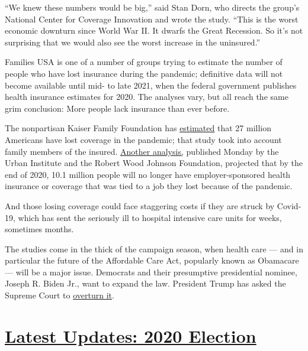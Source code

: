 ``We knew these numbers would be big,'' said Stan Dorn, who directs the
group's National Center for Coverage Innovation and wrote the study.
``This is the worst economic downturn since World War II. It dwarfs the
Great Recession. So it's not surprising that we would also see the worst
increase in the uninsured.''

Families USA is one of a number of groups trying to estimate the number
of people who have lost insurance during the pandemic; definitive data
will not become available until mid- to late 2021, when the federal
government publishes health insurance estimates for 2020. The analyses
vary, but all reach the same grim conclusion: More people lack insurance
than ever before.

The nonpartisan Kaiser Family Foundation has
\href{https://www.kff.org/coronavirus-covid-19/issue-brief/eligibility-for-aca-health-coverage-following-job-loss/}{estimated}
that 27 million Americans have lost coverage in the pandemic; that study
took into account family members of the insured.
\href{https://www.rwjf.org/en/library/research/2020/07/changes-in-health-insurance-coverage-due-to-the-covid-19-recession--preliminary-estimates-using-microsimulation.html?cid=xem_other_unpd_ini:quickstrike_dte:20200713_des:coverage\%20changes;\%20covid}{Another
analysis,} published Monday by the Urban Institute and the Robert Wood
Johnson Foundation, projected that by the end of 2020, 10.1 million
people will no longer have employer-sponsored health insurance or
coverage that was tied to a job they lost because of the pandemic.

And those losing coverage could face staggering costs if they are struck
by Covid-19, which has sent the seriously ill to hospital intensive care
units for weeks, sometimes months.

The studies come in the thick of the campaign season, when health care
--- and in particular the future of the Affordable Care Act, popularly
known as Obamacare --- will be a major issue. Democrats and their
presumptive presidential nominee, Joseph R. Biden Jr., want to expand
the law. President Trump has asked the Supreme Court to
\href{https://www.nytimes3xbfgragh.onion/2020/06/22/us/politics/republicans-health-care-coronavirus.html}{overturn
it}.

\hypertarget{latest-updates-2020-election}{%
\section{\texorpdfstring{\href{https://www.nytimes3xbfgragh.onion/2020/07/31/us/elections/biden-vs-trump.html?action=click\&pgtype=Article\&state=default\&region=MAIN_CONTENT_1\&context=storylines_live_updates}{Latest
Updates: 2020
Election}}{Latest Updates: 2020 Election}}\label{latest-updates-2020-election}}

